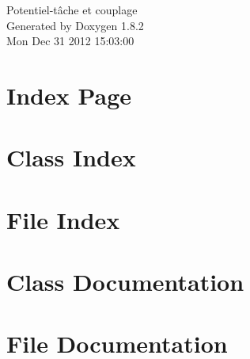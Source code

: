 \documentclass{book}
\begin{document}
\begin{titlepage}
\vspace*{7cm}
\begin{center}
{\Large Potentiel-\/tâche et couplage }\\
\vspace*{1cm}
{\large Generated by Doxygen 1.8.2}\\
\vspace*{0.5cm}
{\small Mon Dec 31 2012 15:03:00}\\
\end{center}
\end{titlepage}
\clearemptydoublepage
{}
\tableofcontents
\clearemptydoublepage
{}
\chapter{Index Page}
\label{index}
\chapter{Class Index}

\chapter{File Index}

\chapter{Class Documentation}






\chapter{File Documentation}







\printindex
\end{document}
